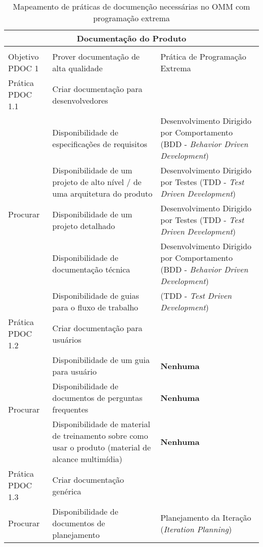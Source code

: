 \begin{longtable}{|p{2cm}|p{7cm}|p{7cm}|}
  \caption{Mapeamento de práticas de documenção necessárias no OMM com
    programação extrema} \\
  \multicolumn{3}{|c|}{\cellcolor[gray]{0.6}  Documentação do Produto}\\
  \endhead
  & & \\
  \hline \cellcolor[gray]{0.6} Objetivo PDOC 1 & \cellcolor[gray]{0.6}
  Prover documentação de alta qualidade & Prática de Programação Extrema \\
  \hline \cellcolor[gray]{0.9} Prática PDOC 1.1 &
  \cellcolor[gray]{0.9}
  Criar documentação para desenvolvedores & \\
  \hline \multirow{5}{*}{Procurar} & Disponibilidade de especificações
  de requisitos & Desenvolvimento Dirigido por Comportamento (BDD -
  \textit{Behavior
    Driven Development}) \\
  \cline{2-3} & Disponibilidade de um projeto de alto nível / de uma
  arquitetura do produto & Desenvolvimento Dirigido por Testes (TDD -
  \textit{Test
    Driven Development}) \\
  \cline{2-3} & Disponibilidade de um projeto detalhado &
  Desenvolvimento Dirigido por Testes (TDD - \textit{Test
    Driven Development}) \\
  \cline{2-3} & Disponibilidade de documentação técnica &
  Desenvolvimento Dirigido por Comportamento (BDD - \textit{Behavior
    Driven Development}) \\
  \cline{2-3} & Disponibilidade de guias para o fluxo de trabalho &
  (TDD -
  \textit{Test Driven Development}) \\
  \hline \cellcolor[gray]{0.9} Prática PDOC 1.2 &
  \cellcolor[gray]{0.9}
  Criar documentação para usuários & \\
  \hline \multirow{3}{*}{Procurar} & Disponibilidade de um guia para
  usuário &
  \textbf{Nenhuma} \\
  \cline{2-3} & Disponibilidade de documentos de perguntas frequentes
  &
  \textbf{Nenhuma} \\
  \cline{2-3} & Disponibilidade de material de treinamento sobre como
  usar o produto (material de alcance multimídia) &
  \textbf{Nenhuma} \\
  \hline \cellcolor[gray]{0.9} Prática PDOC 1.3 &
  \cellcolor[gray]{0.9}
  Criar documentação genérica & \\
  \hline \multirow{3}{*}{Procurar} & Disponibilidade de documentos de
  planejamento &
  Planejamento da Iteração (\textit{Iteration Planning}) \\

\end{longtable}
